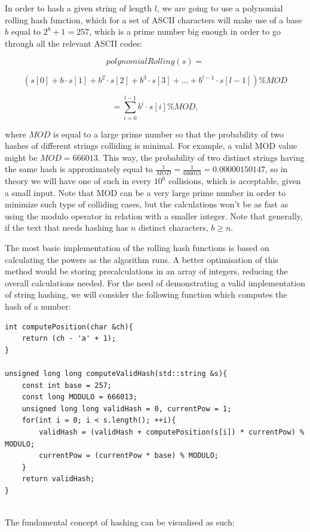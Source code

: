\documentclass[letterpaper]{article}
\begin{document}
In order to hash a given string of length $l$, we are going to use a polynomial rolling hash function, which for a set of ASCII characters will make use of a base $b$ equal to $2^{8}+1=257$, which is a prime number big enough in order to go through all the relevant ASCII codes:


$$
polynomialRolling(s) =
$$

$$
(s[0] + b\cdot s[1] + b^{2}\cdot s[2] + b^{3}\cdot s[3] + \dots + b^{l - 1}\cdot s[l-1])  \% MOD
$$

$$
= \sum_{i=0} ^{l - 1} b^{i} \cdot s[i] \% MOD,
$$

where $MOD$ is equal to a large prime number so that the probability of two hashes of different strings colliding is minimal. For example, a valid MOD value might be $MOD = 666013$. This way, the probability of two distinct strings having the same hash is approximately equal to $\frac{1}{MOD} = \frac{1}{666013} = 0.00000150147$, so in theory we will have one of such in every $10^{6}$ collisions, which is acceptable, given a small input. Note that MOD can be a very large prime number in order to minimize such type of colliding cases, but the calculations won't be as fast as using the modulo operator in relation with a smaller integer. Note that generally, if the text that needs hashing has $n$ distinct characters, $b\geq n$.

The most basic implementation of the rolling hash functions is based on calculating the powers as the algorithm runs. A better optimisation of this method would be storing precalculations in an array of integers, reducing the overall calculations needed. For the need of demonstrating a valid implementation of string hashing, we will consider the following function which computes the hash of a number:

\begin{lstlisting}
int computePosition(char &ch){
    return (ch - 'a' + 1);
}

unsigned long long computeValidHash(std::string &s){
    const int base = 257;
    const long MODULO = 666013;
    unsigned long long validHash = 0, currentPow = 1;
    for(int i = 0; i < s.length(); ++i){
        validHash = (validHash + computePosition(s[i]) * currentPow) % MODULO;
        currentPow = (currentPow * base) % MODULO;
    }
    return validHash;
}


\end{lstlisting}

The fundamental concept of hashing can be visualised as such:
\end{document}
